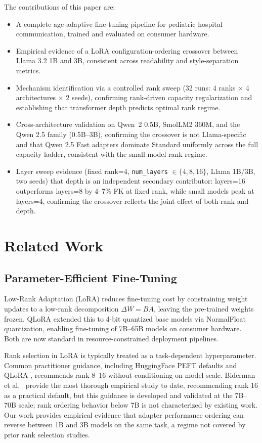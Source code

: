 \documentclass[ASNA,twocolumn]{USG} %
\begin{document}
The contributions of this paper are:
\begin{itemize}
    \item A complete age-adaptive fine-tuning pipeline for pediatric hospital communication, trained and evaluated on consumer hardware.
    \item Empirical evidence of a LoRA configuration-ordering crossover between Llama 3.2 1B and 3B, consistent across readability and style-separation metrics.
    \item Mechanism identification via a controlled rank sweep (32 runs: 4 ranks $\times$ 4 architectures $\times$ 2 seeds), confirming rank-driven capacity regularization and establishing that transformer depth predicts optimal rank regime.
    \item Cross-architecture validation on Qwen~2 0.5B, SmolLM2 360M, and the Qwen 2.5 family (0.5B--3B), confirming the crossover is not Llama-specific and that Qwen 2.5 Fast adapters dominate Standard uniformly across the full capacity ladder, consistent with the small-model rank regime.
    \item Layer sweep evidence (fixed rank=4, \texttt{num\_layers} $\in \{4, 8, 16\}$, Llama 1B/3B, two seeds) that depth is an independent secondary contributor: layers=16 outperforms layers=8 by 4--7\% FK at fixed rank, while small models peak at layers=4, confirming the crossover reflects the joint effect of both rank and depth.
\end{itemize}

\section{Related Work}\label{sec2}

\subsection{Parameter-Efficient Fine-Tuning}

Low-Rank Adaptation (LoRA) \cite{hu2022lora} reduces fine-tuning cost by constraining weight updates to a low-rank decomposition $\Delta W = BA$, leaving the pre-trained weights frozen. QLoRA \cite{dettmers2023qlora} extended this to 4-bit quantized base models via NormalFloat quantization, enabling fine-tuning of 7B--65B models on consumer hardware. Both are now standard in resource-constrained deployment pipelines.

Rank selection in LoRA is typically treated as a task-dependent hyperparameter. Common practitioner guidance, including HuggingFace PEFT defaults and QLoRA \cite{dettmers2023qlora}, recommends rank 8--16 without conditioning on model scale. Biderman et al.~\cite{biderman2024lora} provide the most thorough empirical study to date, recommending rank 16 as a practical default, but this guidance is developed and validated at the 7B--70B scale; rank ordering behavior below 7B is not characterized by existing work. Our work provides empirical evidence that adapter performance ordering can reverse between 1B and 3B models on the same task, a regime not covered by prior rank selection studies.
\end{document}
